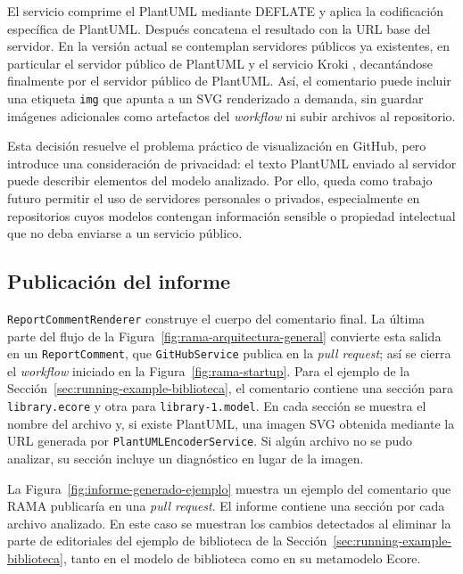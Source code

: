 \documentclass[11pt]{article}
\begin{document}
El servicio comprime el PlantUML mediante DEFLATE y aplica la codificación específica de PlantUML. Después concatena el resultado con la URL base del servidor. En la versión actual se contemplan servidores públicos ya existentes, en particular el servidor público de PlantUML \cite{plantuml-server} y el servicio Kroki \cite{kroki}, decantándose finalmente por el servidor público de PlantUML. Así, el comentario puede incluir una etiqueta \texttt{img} que apunta a un SVG renderizado a demanda, sin guardar imágenes adicionales como artefactos del \textit{workflow} ni subir archivos al repositorio.

Esta decisión resuelve el problema práctico de visualización en GitHub, pero introduce una consideración de privacidad: el texto PlantUML enviado al servidor puede describir elementos del modelo analizado. Por ello, queda como trabajo futuro permitir el uso de servidores personales o privados, especialmente en repositorios cuyos modelos contengan información sensible o propiedad intelectual que no deba enviarse a un servicio público.

\subsection{Publicación del informe}

\texttt{ReportCommentRenderer} construye el cuerpo del comentario final. La última parte del flujo de la Figura~\ref{fig:rama-arquitectura-general} convierte esta salida en un \texttt{ReportComment}, que \texttt{GitHubService} publica en la \textit{pull request}; así se cierra el \textit{workflow} iniciado en la Figura~\ref{fig:rama-startup}. Para el ejemplo de la Sección~\ref{sec:running-example-biblioteca}, el comentario contiene una sección para \texttt{library.ecore} y otra para \texttt{library-1.model}. En cada sección se muestra el nombre del archivo y, si existe PlantUML, una imagen SVG obtenida mediante la URL generada por \texttt{PlantUMLEncoderService}. Si algún archivo no se pudo analizar, su sección incluye un diagnóstico en lugar de la imagen.

La Figura~\ref{fig:informe-generado-ejemplo} muestra un ejemplo del comentario que RAMA publicaría en una \textit{pull request}. El informe contiene una sección por cada archivo analizado. En este caso se muestran los cambios detectados al eliminar la parte de editoriales del ejemplo de biblioteca de la Sección~\ref{sec:running-example-biblioteca}, tanto en el modelo de biblioteca como en su metamodelo Ecore.
\end{document}

